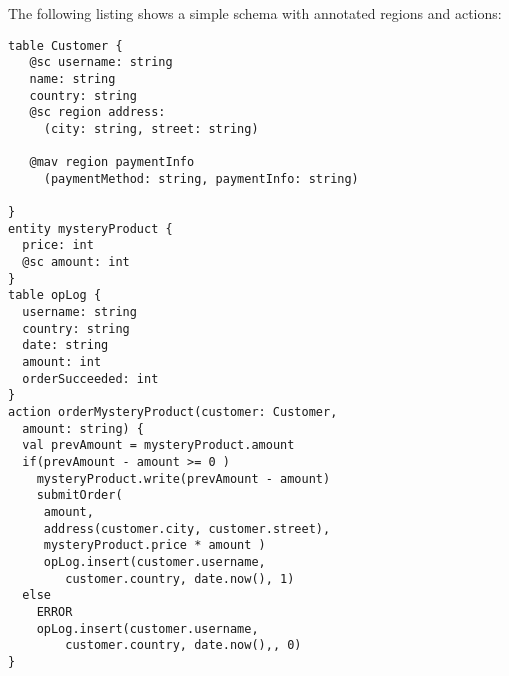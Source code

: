 \documentclass[preprint, numbers]{sigplanconf}
\begin{document}
The following listing shows a simple schema with annotated regions and actions:
\begin{lstlisting}[basicstyle=\small]
table Customer {
   @sc username: string
   name: string 
   country: string
   @sc region address: 
     (city: string, street: string)
     
   @mav region paymentInfo 
     (paymentMethod: string, paymentInfo: string)

}
entity mysteryProduct {
  price: int
  @sc amount: int
}
table opLog {
  username: string
  country: string
  date: string
  amount: int
  orderSucceeded: int
}
action orderMysteryProduct(customer: Customer,
  amount: string) {
  val prevAmount = mysteryProduct.amount
  if(prevAmount - amount >= 0 )
    mysteryProduct.write(prevAmount - amount)
    submitOrder(
     amount, 
     address(customer.city, customer.street), 
     mysteryProduct.price * amount )
     opLog.insert(customer.username, 
        customer.country, date.now(), 1)
  else 
    ERROR
    opLog.insert(customer.username, 
        customer.country, date.now(),, 0)
}
\end{lstlisting}
\end{document}
